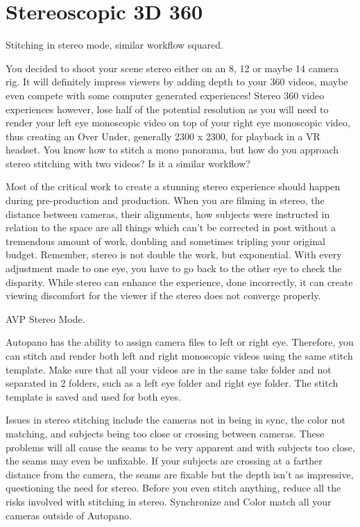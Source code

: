 \chapter{Stereoscopic 3D 360}
\pagecolor{white}
\label{chap:42}
\begin{fullwidth}

\problem

{\large Stitching in stereo mode, similar workflow squared. \par}

You decided to shoot your scene stereo either on an 8, 12 or maybe 14 camera rig. It will definitely impress viewers by adding depth to your 360 videos, maybe even compete with some computer generated experiences! Stereo 360 video experiences however, lose half of the potential resolution as you will need to render your left eye monoscopic video on top of your right eye monoscopic video, thus creating an Over Under, generally 2300 x 2300, for playback in a VR headset. You know how to stitch a mono panorama, but how do you approach stereo stitching with two videos? Is it a similar workflow?


\solution

Most of the critical work to create a stunning stereo experience should happen during pre-production and production. When you are filming in stereo, the distance between cameras, their alignments, how subjects were instructed in relation to the space are all things which can’t be corrected in post without a tremendous amount of work, doubling and sometimes tripling your original budget. Remember, stereo is not double the work, but exponential. With every adjustment made to one eye, you have to go back to the other eye to check the disparity. While stereo can enhance the experience, done incorrectly, it can create viewing discomfort for the viewer if the stereo does not converge properly. 


{\large AVP Stereo Mode. \par}

Autopano has the ability to assign camera files to left or right eye. Therefore, you can stitch and render both left and right monoscopic videos using the same stitch template. Make sure that all your videos are in the same take folder and not separated in 2 folders, such as a left eye folder and right eye folder. The stitch template is saved and used for both eyes. 


Issues in stereo stitching include the cameras not in being in sync, the color not matching, and subjects being too close or crossing between cameras. These problems will all cause the seams to be very apparent and with subjects too close, the seams may even be unfixable. If your subjects are crossing at a farther distance from the camera, the seams are fixable but the depth isn’t as impressive, questioning the need for stereo. Before you even stitch anything, reduce all the risks involved with stitching in stereo. Synchronize and Color match all your cameras outside of Autopano.



\end{fullwidth}
